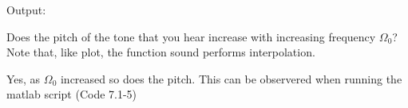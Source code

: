 {\LARGE Output:}

 Does the pitch of the tone that you hear increase with increasing frequency $\Omega_0$? Note that, like plot, the function sound performs interpolation.

	Yes, as $\Omega_0$ increased so does the pitch. This can be observered when running the matlab script (Code 7.1-5)


\pagebreak
